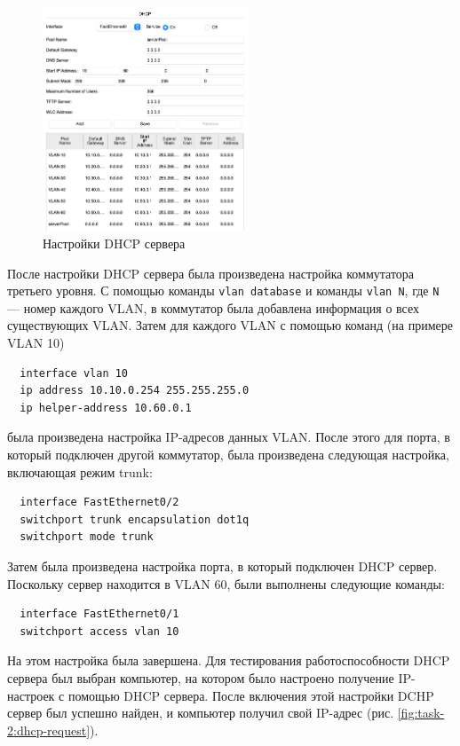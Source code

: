 \documentclass[a4paper, 14pt]{extarticle}
\begin{document}
\begin{figure}[H]
  \centering
  \includegraphics[width=0.55\textwidth]{images/task-2/dhcp-config.png}
  \caption{Настройки DHCP сервера}
  \label{fig:task-2:dhcp-config}
\end{figure}

После настройки DHCP сервера была произведена настройка коммутатора третьего
уровня. С помощью команды \texttt{vlan database} и команды \texttt{vlan N}, где
\texttt{N} --- номер каждого VLAN, в коммутатор была добавлена информация о всех
существующих VLAN. Затем для каждого VLAN с помощью команд (на примере VLAN 10)
\begin{verbatim}
  interface vlan 10
  ip address 10.10.0.254 255.255.255.0
  ip helper-address 10.60.0.1
\end{verbatim}
была произведена настройка IP-адресов данных VLAN. После этого для порта, в
который подключен другой коммутатор, была произведена следующая настройка,
включающая режим trunk:
\begin{verbatim}
  interface FastEthernet0/2
  switchport trunk encapsulation dot1q
  switchport mode trunk
\end{verbatim}
Затем была произведена настройка порта, в который подключен DHCP сервер.
Поскольку сервер находится в VLAN 60, были выполнены следующие команды:
\begin{verbatim}
  interface FastEthernet0/1
  switchport access vlan 10
\end{verbatim}

На этом настройка была завершена. Для тестирования работоспособности DHCP
сервера был выбран компьютер, на котором было настроено получение IP-настроек с
помощью DHCP сервера. После включения этой настройки DCHP сервер был успешно
найден, и компьютер получил свой IP-адрес (рис. \ref{fig:task-2:dhcp-request}).
\end{document}
